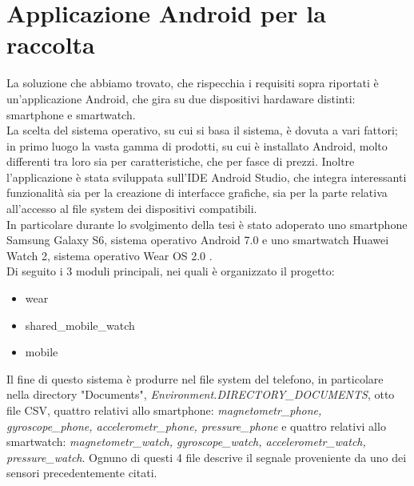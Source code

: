 \documentclass[a4paper, oneside]{book}
\begin{document}
	\section{Applicazione Android per la raccolta}
La soluzione che abbiamo trovato, che rispecchia i requisiti sopra riportati è un'applicazione Android, che gira su due dispositivi hardaware distinti: smartphone e smartwatch. \\ 
La scelta del sistema operativo, su cui si basa il sistema, è dovuta a vari fattori; in primo luogo la vasta gamma di prodotti, su cui è installato Android, molto differenti tra loro sia per caratteristiche, che per fasce di prezzi. Inoltre l'applicazione è stata sviluppata sull’IDE Android Studio, che integra interessanti funzionalità sia per la creazione di interfacce grafiche, sia per la parte relativa all’accesso al file system dei dispositivi compatibili. \\
In particolare durante lo svolgimento della tesi è stato adoperato uno smartphone Samsung Galaxy S6, sistema operativo Android 7.0 e uno smartwatch Huawei Watch 2, sistema operativo Wear OS 2.0 . \\
Di seguito i 3 moduli principali, nei quali è organizzato il progetto:
\begin{itemize}
\item wear
\item shared\_mobile\_watch 
\item mobile \\
\end{itemize}
Il fine di questo sistema è produrre nel file system del telefono, in particolare nella directory "Documents", \textit{Environment.DIRECTORY\_DOCUMENTS}, otto file CSV, quattro relativi allo smartphone: \textit{magnetometr\_phone, gyroscope\_phone, accelerometr\_phone, pressure\_phone} e quattro relativi allo smartwatch: \textit{magnetometr\_watch, gyroscope\_watch, accelerometr\_watch, pressure\_watch}. Ognuno di questi 4 file descrive il segnale proveniente da uno dei sensori precedentemente citati. \\
\end{document}
